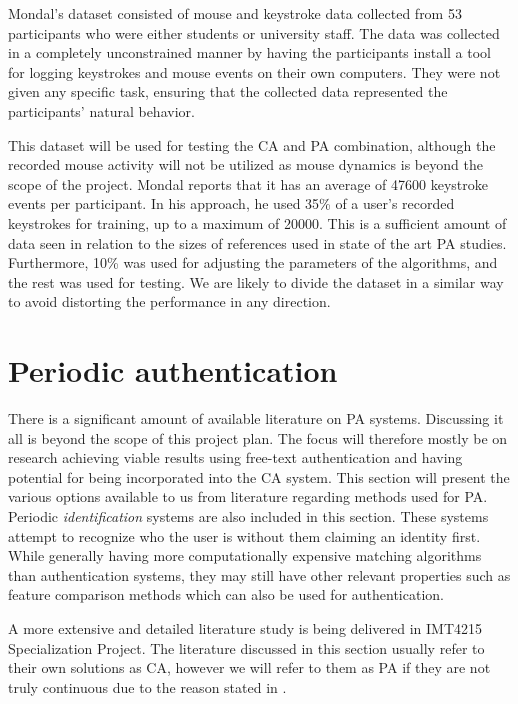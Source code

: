 \documentclass[informationsecurity]{gucmasterproject}
\begin{document}
Mondal's dataset consisted of mouse and keystroke data collected from 53 participants who were either students or university staff.
The data was collected in a completely unconstrained manner by having the participants install a tool for logging keystrokes and mouse events on their own computers.
They were not given any specific task, ensuring that the collected data represented the participants' natural behavior.

This dataset will be used for testing the CA and PA combination, although the recorded mouse activity will not be utilized as mouse dynamics is beyond the scope of the project.
Mondal reports that it has an average of 47600 keystroke events per participant. 
In his approach, he used 35\% of a user's recorded keystrokes for training, up to a maximum of 20000.
This is a sufficient amount of data seen in relation to the sizes of references used in state of the art PA studies.
Furthermore, 10\% was used for adjusting the parameters of the algorithms, and the rest was used for testing.
We are likely to divide the dataset in a similar way to avoid distorting the performance in any direction. 


\section{Periodic authentication}
\label{sec:related-other}
There is a significant amount of available literature on PA systems.
Discussing it all is beyond the scope of this project plan. The focus will therefore mostly be on research achieving viable results using free-text authentication and having potential for being incorporated into the CA system.
This section will present the various options available to us from literature regarding methods used for PA.
Periodic \textit{identification} systems are also included in this section.
These systems attempt to recognize who the user is without them claiming an identity first.
While generally having more computationally expensive matching algorithms than authentication systems, they may still have other relevant properties such as feature comparison methods which can also be used for authentication.

A more extensive and detailed literature study is being delivered in IMT4215 Specialization Project.
The literature discussed in this section usually refer to their own solutions as CA, however we will refer to them as PA if they are not truly continuous due to the reason stated in .
\end{document}
